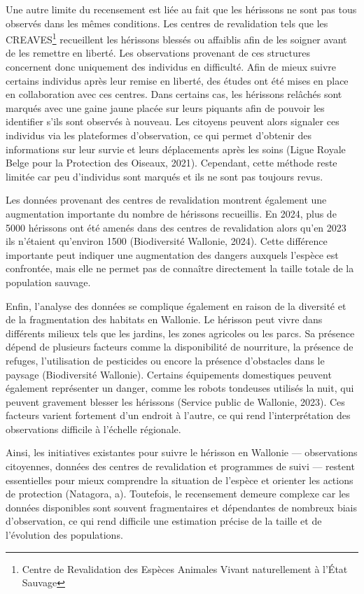 \documentclass[a4paper,11pt]{article}
\begin{document}
Une autre limite du recensement est liée au fait que les hérissons ne sont pas tous observés dans les mêmes conditions. Les centres de revalidation tels que les CREAVES\footnote{Centre de Revalidation des Espèces Animales Vivant naturellement à l'État Sauvage}  recueillent les hérissons blessés ou affaiblis afin de les soigner avant de les remettre en liberté. Les observations provenant de ces structures concernent donc uniquement des individus en difficulté. Afin de mieux suivre certains individus après leur remise en liberté, des études ont été mises en place en collaboration avec ces centres. Dans certains cas, les hérissons relâchés sont marqués avec une gaine jaune placée sur leurs piquants afin de pouvoir les identifier s’ils sont observés à nouveau. Les citoyens peuvent alors signaler ces individus via les plateformes d’observation, ce qui permet d’obtenir des informations sur leur survie et leurs déplacements après les soins (Ligue Royale Belge pour la Protection des Oiseaux, 2021). Cependant, cette méthode reste limitée car peu d’individus sont marqués et ils ne sont pas toujours revus.

Les données provenant des centres de revalidation montrent également une augmentation importante du nombre de hérissons recueillis. En 2024, plus de 5000 hérissons ont été amenés dans des centres de revalidation alors qu’en 2023 ils n’étaient qu’environ 1500 (Biodiversité Wallonie, 2024). Cette différence importante peut indiquer une augmentation des dangers auxquels l’espèce est confrontée, mais elle ne permet pas de connaître directement la taille totale de la population sauvage.

Enfin, l’analyse des données se complique également en raison de la diversité et de la fragmentation des habitats en Wallonie. Le hérisson peut vivre dans différents milieux tels que les jardins, les zones agricoles ou les parcs. Sa présence dépend de plusieurs facteurs comme la disponibilité de nourriture, la présence de refuges, l’utilisation de pesticides ou encore la présence d’obstacles dans le paysage (Biodiversité Wallonie). Certains équipements domestiques peuvent également représenter un danger, comme les robots tondeuses utilisés la nuit, qui peuvent gravement blesser les hérissons (Service public de Wallonie, 2023). Ces facteurs varient fortement d’un endroit à l’autre, ce qui rend l’interprétation des observations difficile à l’échelle régionale.

Ainsi, les initiatives existantes pour suivre le hérisson en Wallonie — observations citoyennes, données des centres de revalidation et programmes de suivi — restent essentielles pour mieux comprendre la situation de l’espèce et orienter les actions de protection (Natagora, a). Toutefois, le recensement demeure complexe car les données disponibles sont souvent fragmentaires et dépendantes de nombreux biais d’observation, ce qui rend difficile une estimation précise de la taille et de l’évolution des populations.
\end{document}
